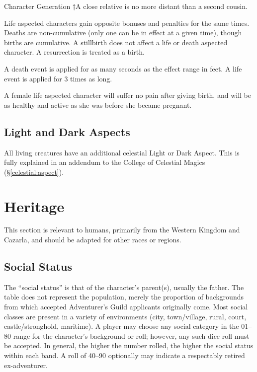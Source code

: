 \begin{Chapter}{Character Generation}
†A close relative is no more distant than a second cousin.

Life aspected characters gain opposite bonuses and penalties for the
same times.  Deaths are non-cumulative (only one can be in effect at a
given time), though births are cumulative.  A stillbirth does not
affect a life or death aspected character. A resurrection is treated
as a birth.

A death event is applied for as many seconds as the effect range in
feet.  A life event is applied for 3 times as long.

A female life aspected character will suffer no pain after giving
birth, and will be as healthy and active as she was before she became
pregnant.

\subsection{Light and Dark Aspects}

All living creatures have an additional celestial Light or Dark
Aspect.  This is fully explained in an addendum to the College of
Celestial Magics (\S\ref{celestial:aspect}).


\section{Heritage}
\label{heritage}

This section is relevant to humans, primarily from the Western Kingdom
and Cazarla, and should be adapted for other races or regions.

\subsection{Social Status}

The “social status” is that of the character’s parent(s), usually the
father. The table does not represent the population, merely the
proportion of backgrounds from which accepted Adventurer’s Guild
applicants originally come. Most social classes are present in a
variety of environments (city, town/village, rural, court,
castle/stronghold, maritime).  A player may choose any social category
in the 01--80 range for the character’s background or roll; however,
any such dice roll must be accepted.  In general, the higher the
number rolled, the higher the social status within each band. A roll
of 40--90 optionally may indicate a respectably retired ex-adventurer.


\end{Chapter}
